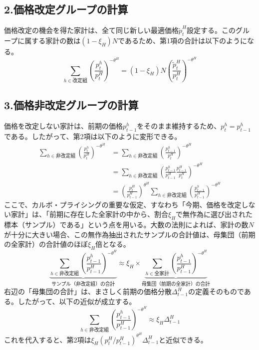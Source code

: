 \subsection*{2.価格改定グループの計算}
\label{sec:appendix_dispersion_dynamics_sub2}
価格改定の機会を得た家計は、全て同じ新しい最適価格\(\tilde{p}_t^H\)設定する。このグループに属する家計の数は\((1-\xi_H)N\)であるため、第1項の合計は以下のようになる。
\begin{equation}
\sum_{h\in\text{改定組}}\left(\frac{p_t^h}{p_t^H}\right)^{-\theta^H}=(1-\xi_H)N\left(\frac{\tilde{p}_t^H}{p_t^H}\right)^{-\theta^H}
\label{eq:appendix_dispersion_dynamics_sub2_revising_group}
\end{equation}

\subsection*{3.価格非改定グループの計算}
\label{sec:appendix_dispersion_dynamics_sub3}
価格を改定しない家計は、前期の価格\(p_{t-1}^h\)をそのまま維持するため、\(p_t^h=p_{t-1}^h\)である。したがって、第2項は以下のように変形できる。
\begin{align}
\sum_{h\in\text{非改定組}}\left(\frac{p_t^h}{p_t^H}\right)^{-\theta^H}&=\sum_{h\in\text{非改定組}}\left(\frac{p_{t-1}^h}{p_t^H}\right)^{-\theta^H} \nonumber \\
&=\sum_{h\in\text{非改定組}}\left(\frac{p_{t-1}^h}{p_{t-1}^H}\frac{p_{t-1}^H}{p_t^H}\right)^{-\theta^H} \nonumber \\
&=\left(\frac{p_t^H}{p_{t-1}^H}\right)^{\theta^H}\sum_{h\in\text{非改定組}}\left(\frac{p_{t-1}^h}{p_{t-1}^H}\right)^{-\theta^H}
\label{eq:appendix_dispersion_dynamics_sub3_derivation}
\end{align}
ここで、カルボ・プライシングの重要な仮定、すなわち「今期、価格を改定しない家計」は、「前期に存在した全家計の中から、割合\(\xi_H\)で無作為に選び出された標本（サンプル）である」という点を用いる。大数の法則によれば、家計の数\(N\)が十分に大きい場合、この無作為抽出されたサンプルの合計値は、母集団（前期の全家計）の合計値のほぼ\(\xi_H\)倍となる。
\begin{equation}
\underbrace{\sum_{h\in\text{非改定組}}\left(\frac{p_{t-1}^h}{p_{t-1}^H}\right)^{-\theta^H}}_{\text{サンプル（非改定組）の合計}}\approx\xi_H\times\underbrace{\sum_{h\in\text{全家計}}\left(\frac{p_{t-1}^h}{p_{t-1}^H}\right)^{-\theta^H}}_{\text{母集団（前期の全家計）の合計}}
\label{eq:appendix_dispersion_dynamics_sub3_sampling_assumption}
\end{equation}
右辺の「母集団の合計」は、まさしく前期の価格分散\(\Delta_{t-1}^H\)の定義そのものである。したがって、以下の近似が成立する。
\begin{equation}
\sum_{h\in\text{非改定組}}\left(\frac{p_{t-1}^h}{p_{t-1}^H}\right)^{-\theta^H}\approx\xi_H\Delta_{t-1}^H
\label{eq:appendix_dispersion_dynamics_sub3_sampling_result}
\end{equation}
これを代入すると、第2項は\(\xi_H(p_t^H/p_{t-1}^H)^{\theta^H}\Delta_{t-1}^H\)と近似できる。

